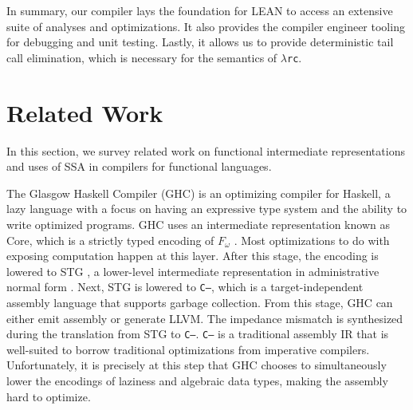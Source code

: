\documentclass[conference]{IEEEtran}
\newcommand{\lambdarc}{\ensuremath{\lambda}\texttt{rc}}
\begin{document}
In summary, our compiler lays the foundation for LEAN to access an extensive
suite of analyses and optimizations. It also provides the compiler engineer tooling
for debugging and unit testing. Lastly, it allows us to provide deterministic
tail call elimination, which is necessary for the semantics of \lambdarc{}.

\section{Related Work}
In this section, we survey related work on functional intermediate representations
and uses of SSA in compilers for functional languages.

The Glasgow Haskell Compiler (GHC) \cite{jones1993glasgow} is an optimizing compiler for Haskell,
a lazy language with a focus on having an expressive type system and the ability to write
optimized programs. GHC uses an intermediate representation known as Core,
which is a strictly typed encoding of $F_\omega$ \cite{pierce2002types}.
Most optimizations to do with
exposing computation happen at this layer. After this stage, the encoding is
lowered to STG \cite{jones1992implementing},
a lower-level intermediate representation in
administrative normal form \cite{flanagan1993essence}.
Next, STG is lowered to \texttt{C--}\cite{jones1999c}, which is a
target-independent assembly language that supports garbage collection.
From this stage, GHC can either emit assembly or
generate LLVM. The impedance mismatch is synthesized during the translation from
STG to \texttt{C--}. \texttt{C--} is a traditional assembly IR that is well-suited
to borrow traditional optimizations from imperative compilers. Unfortunately, it
is precisely at this step that GHC chooses to simultaneously lower the encodings
of laziness and algebraic data types, making the assembly hard to optimize.


\end{document}
